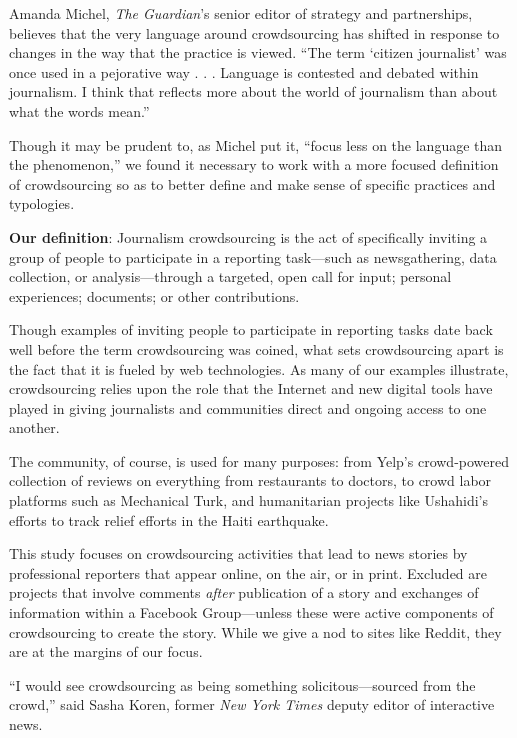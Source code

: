\documentclass[notoc, symmetric, nobib, nols]{towcenter-guideto-book}
\begin{document}
Amanda Michel, \textit{The Guardian}'s senior editor of strategy and partnerships, believes that the very language around crowdsourcing has shifted in response to changes in the way that the practice is viewed. ``The term ‘citizen journalist' was once used in a pejorative way . . . Language is contested and debated within journalism. I think that reflects more about the world of journalism than about what the words mean.''%

Though it may be prudent to, as Michel put it, ``focus less on the language than the phenomenon,'' we found it necessary to work with a more focused definition of crowdsourcing so as to better define and make sense of specific practices and typologies. 

\textbf{Our definition}: Journalism crowdsourcing is the act of specifically inviting a group of people to participate in a reporting task---such as newsgathering, data collection, or analysis---through a targeted, open call for input; personal experiences; documents; or other contributions.

Though examples of inviting people to participate in reporting tasks date back well before the term crowdsourcing was coined, what sets crowdsourcing apart is the fact that it is fueled by web technologies. As many of our examples illustrate, crowdsourcing relies upon the role that the Internet and new digital tools have played in giving journalists and communities direct and ongoing access to one another.

The community, of course, is used for many purposes: from Yelp's crowd-powered collection of reviews on everything from restaurants to doctors, to crowd labor platforms such as Mechanical Turk, and humanitarian projects like Ushahidi's efforts to track relief efforts in the Haiti earthquake. 

This study focuses on crowdsourcing activities that lead to news stories by professional reporters that appear online, on the air, or in print.  Excluded are projects that involve comments \textit{after} publication of a story and exchanges of information within a Facebook Group---unless these were active components of crowdsourcing to create the story. While we give a nod to sites like Reddit, they are at the margins of our focus.%

 ``I would see crowdsourcing as being something solicitous---sourced from the crowd,'' said Sasha Koren, former \textit{New York Times} deputy editor of interactive news.%
 
\end{document}
